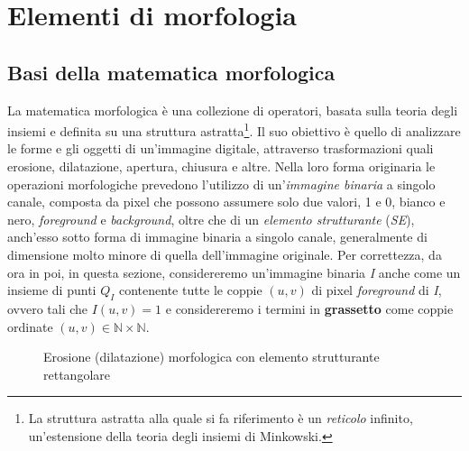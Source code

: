 \section{Elementi di morfologia}
\label{sec:math-morph}

\subsection{Basi della matematica morfologica}
\label{subsec:math-morph-basis}
La matematica morfologica \`e una collezione di operatori, basata sulla teoria degli insiemi e definita su una struttura astratta\footnote{La struttura astratta alla quale si fa riferimento \`e un \textit{reticolo} infinito, un'estensione della teoria degli insiemi di Minkowski.}. Il suo obiettivo \`e quello di analizzare le forme e gli oggetti di un'immagine digitale, attraverso trasformazioni quali erosione, dilatazione, apertura, chiusura e altre. Nella loro forma originaria le operazioni morfologiche prevedono l'utilizzo di un'\textit{immagine binaria} a singolo canale, composta da pixel che possono assumere solo due valori, 1 e 0, bianco e nero, \textit{foreground} e \textit{background}, oltre che di un \textit{elemento strutturante} (\textit{SE}), anch'esso sotto forma di immagine binaria a singolo canale, generalmente di dimensione molto minore di quella dell'immagine originale. Per correttezza, da ora in poi, in questa sezione, considereremo un'immagine binaria \textit{I} anche come un insieme di punti $Q_{I}$ contenente tutte le coppie $(u,v)$ di pixel \textit{foreground} di \textit{I}, ovvero tali che $I(u, v) = 1$ e considereremo i termini in \textbf{grassetto} come coppie ordinate $(u,v) \in \mathbb{N}\times\mathbb{N}$.\par
\begin{figure}[t]
	\centering
	\caption{Erosione (dilatazione) morfologica con elemento strutturante rettangolare} \label{fig:erosion-dilation}
\end{figure}
